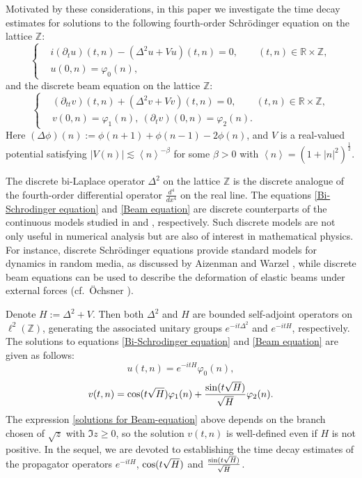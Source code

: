 \documentclass[reqno, 11pt]{amsart}
\newcommand\R{\mathbb{R}}
\newcommand\Z{\mathbb{Z}}
\numberwithin{equation}{section}
\begin{document}
Motivated by these considerations,  in this paper we investigate the time decay estimates for solutions to the following fourth-order Schr\"{o}dinger equation on the lattice $\Z$:
\begin{equation}\label{Bi-Schrodinger equation}
\left\{\begin{aligned}&i(\partial_tu)(t,n)-(\Delta^2u+Vu)(t,n)=0,\qquad (t,n)\in\R\times\Z,\\
&u(0,n)=\varphi_0(n),\end{aligned}\right.
\end{equation}
and the discrete beam equation on the lattice $\Z$:
\begin{equation}\label{Beam equation}
\left\{\begin{aligned}&(\partial_{tt}v)(t,n)+(\Delta^2v+Vv)(t,n)=0,\qquad (t,n)\in\R\times\Z,\\
&v(0,n)=\varphi_1(n),\ \left(\partial_{t}v\right)(0,n)=\varphi_2(n).\end{aligned}\right.
\end{equation}
Here $(\Delta\phi)(n):=\phi(n+1)+\phi(n-1)-2\phi(n)$, and $V$ is a real-valued potential satisfying $|V(n)|\lesssim \left<n\right>^{-\beta}$ for some $\beta>0$ with $\left<n\right>=(1+|n|^2)^{\frac{1}{2}}$.

The discrete bi-Laplace operator $\Delta^2$ on the lattice $\Z$ is the discrete analogue of the fourth-order differential operator $\frac{d^4}{dx^4}$ on the real line. The equations \eqref{Bi-Schrodinger equation} and \eqref{Beam equation} are discrete counterparts of the continuous models studied in \cite{SWY22} and \cite{CLSY25}, respectively. Such discrete models are not only useful in numerical analysis but are also of interest in mathematical physics. For instance, discrete Schr\"{o}dinger equations provide standard models for dynamics in random media, as discussed by Aizenman and Warzel \cite{AW15}, while discrete beam equations can be used to describe the deformation of elastic beams under external forces (cf.~\"{O}chsner \cite{Och21}).

Denote $H:=\Delta^2+V$. Then both $\Delta^2$ and $H$ are bounded self-adjoint operators on $\ell^2(\Z)$, generating the associated unitary groups $e^{-it\Delta^2}$ and $e^{-itH}$, respectively. The solutions to equations \eqref{Bi-Schrodinger equation} and \eqref{Beam equation} are given as follows:
\begin{equation}\label{solutions for Bi-Schrodinger}
u(t,n)=e^{-itH}\varphi_0(n),
\end{equation}
\begin{equation}\label{solutions for Beam-equation}
v(t,n)={\rm cos}(t\sqrt H)\varphi_1(n)+\frac{{\rm sin}(t\sqrt H)}{\sqrt H}\varphi_2(n).
\end{equation}
The expression \eqref{solutions for Beam-equation} above depends on the branch chosen of $\sqrt z$ with $\Im z\geq0$, so the solution $v(t,n)$ is well-defined even if $H$ is not positive. In the sequel, we are devoted to establishing the time decay estimates of the propagator operators $e^{-itH}$, ${\rm cos}(t\sqrt H)$ and $\frac{{\rm sin}(t\sqrt H)}{\sqrt H}$.
\end{document}
